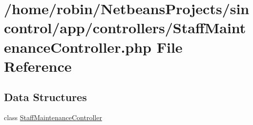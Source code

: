 \hypertarget{_staff_maintenance_controller_8php}{}\section{/home/robin/\+Netbeans\+Projects/sincontrol/app/controllers/\+Staff\+Maintenance\+Controller.php File Reference}
\label{_staff_maintenance_controller_8php}
\subsection*{Data Structures}
\begin{DoxyCompactItemize}
\item 
class \hyperlink{class_staff_maintenance_controller}{Staff\+Maintenance\+Controller}
\end{DoxyCompactItemize}
